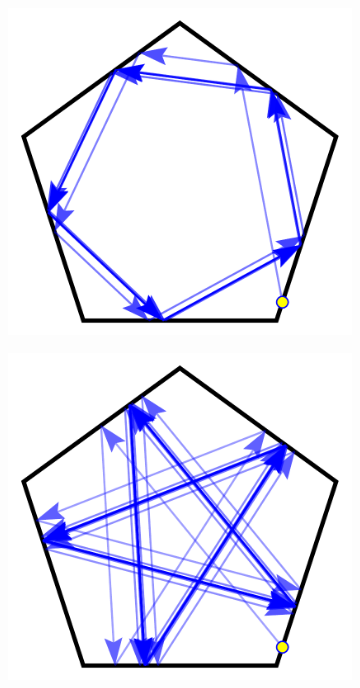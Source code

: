 \documentclass[letterpaper, 10 pt, conference]{ieeeconf}  %
\begin{document}
\begin{figure}

\begin{subfigure}{.25\textwidth}
\centering

\includegraphics[width=0.9\linewidth]{figs/pent_05rad.pdf}


\end{subfigure}%
\begin{subfigure}{0.25\textwidth}

\includegraphics[width=0.9\linewidth]{figs/pent_1rad.pdf}


\end{subfigure}
\end{figure}
\end{document}
